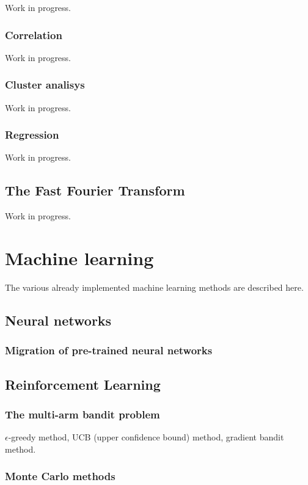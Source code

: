 \documentclass{book}
\begin{document}
Work in progress.
\subsection{Correlation}

Work in progress.
\subsection{Cluster analisys}

Work in progress.
\subsection{Regression}

Work in progress.

\section{The Fast Fourier Transform}


Work in progress.


\chapter{Machine learning}

The various already implemented machine learning methods are described here.

\section{Neural networks}

\subsection{Migration of pre-trained neural networks}


\section{Reinforcement Learning}

\subsection{The multi-arm bandit problem}

$\epsilon$-greedy method, UCB (upper confidence bound) method, gradient bandit method.

\subsection{Monte Carlo methods}
\end{document}
